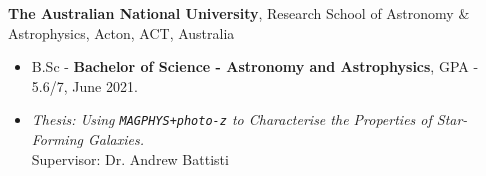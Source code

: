 \documentclass{res}
\begin{document}
\begin{resume}
    {\bf
 The Australian National University}, Research School of Astronomy \& Astrophysics, Acton, ACT, Australia 
	\begin{itemize} 
      \item[]
        B.Sc - {\bf Bachelor of Science - Astronomy and Astrophysics}, GPA - 5.6/7, June 2021.  
      \item[]
        \textit{Thesis: Using \texttt{MAGPHYS+photo-z} to Characterise the Properties of Star-Forming Galaxies.} \\ \hfill Supervisor: Dr. Andrew Battisti
  \end{itemize}
 





  

\end{resume}
\end{document}
